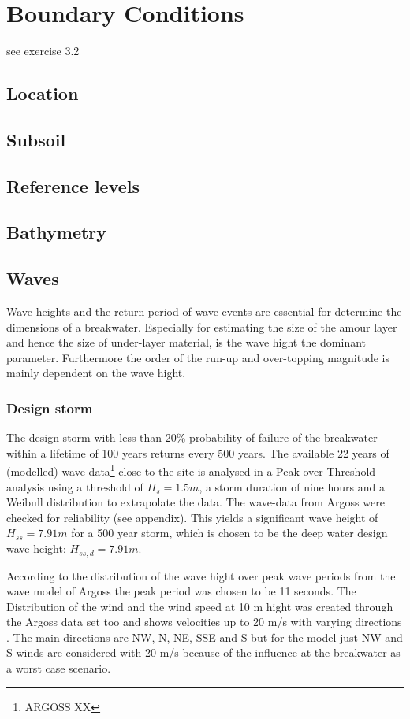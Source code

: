 \chapter{Boundary Conditions}

see exercise 3.2

\section{Location}

\section{Subsoil}

\section{Reference levels}

\section{Bathymetry}

\section{Waves}
Wave heights and the return period of wave events are essential for determine the dimensions of a breakwater. Especially for estimating the size of the amour layer and hence the size of under-layer material, is the wave hight the dominant parameter. Furthermore the order of the run-up and over-topping magnitude is mainly dependent on the wave hight.
\subsection{Design storm}
The design storm with less than 20\% probability of failure of the breakwater within a lifetime of 100 years returns every 500 years.
The available 22 years of (modelled) wave data\footnote{ARGOSS XX} close to the site is analysed in a Peak over Threshold analysis using a threshold of $H_s=1.5m$, a storm duration of nine hours and a Weibull distribution to extrapolate the data. The wave-data from Argoss were checked for reliability (see appendix).
This yields a significant wave height of $H_{ss}=7.91m$ for a 500 year storm, which is chosen to be the deep water design wave height: $H_{ss,d}=7.91m$.

According to the distribution of the wave hight over peak wave periods from the wave model of Argoss %
the peak period was chosen to be 11 seconds.
The Distribution of the wind and the wind speed at 10 m hight was created through the Argoss data set too and shows velocities up to 20 m/s with varying directions
. The main  directions are NW, N, NE, SSE and S but for the model just NW and S winds are considered with 20 m/s because of the influence at the breakwater as a worst case scenario.

